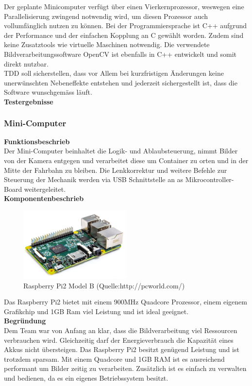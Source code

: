 Der geplante Minicomputer verfügt über einen Vierkernprozessor, weswegen eine Parallelisierung zwingend notwendig wird, um diesen Prozessor auch vollumfänglich nutzen zu können. Bei der Programmiersprache ist C++ aufgrund der Performance und der einfachen Kopplung an C gewählt worden. Zudem sind keine Zusatztools wie virtuelle Maschinen notwendig. Die verwendete Bildverarbeitungssoftware OpenCV ist ebenfalls in C++ entwickelt und somit direkt nutzbar.\\
TDD soll sicherstellen, dass vor Allem bei kurzfristigen Änderungen keine unerwünschten Nebeneffekte entstehen und jederzeit sichergestellt ist, dass die Software wunschgemäss läuft.\\[0.2cm]
\textbf{Testergebnisse}\\[0.2cm]

\subsubsection{Mini-Computer}
\textbf{Funktionsbeschrieb}\\[0.2cm]
Der Mini-Computer beinhaltet die Logik- und Ablaubsteuerung, nimmt Bilder von der Kamera entgegen und verarbeitet diese um Container zu orten und in der Mitte der Fahrbahn zu bleiben. Die Lenkkorrektur und weitere Befehle zur Steuerung der Mechanik werden via USB Schnittstelle an as Mikrocontroller-Board weitergeleitet.\\[0.2cm]
\textbf{Komponentenbeschrieb}\\[0.2cm]
\begin{figure}[H]
	\centering
	\includegraphics[width=0.5\textwidth]{03_Loesungskonzept/pictures/raspberrypi2.png}
	\caption{Raspberry Pi2 Model B (Quelle:http://pcworld.com/)}
\end{figure}
Das Raspberry Pi2 bietet mit einem 900MHz Quadcore Prozessor, einem eigenem Grafikchip und 1GB Ram viel Leistung und ist ideal geeignet.\\[0.2cm]
\textbf{Begründung}\\[0.2cm]
Dem Team war von Anfang an klar, dass die Bildverarbeitung viel Ressourcen verbrauchen wird. Gleichzeitig darf der Energieverbrauch die Kapazität eines Akkus nicht übersteigen. Das Raspberry Pi2 besitzt genügend Leistung und ist trotzdem sparsam. Mit einem Quadcore und 1GB RAM ist es ausreichend performant um Bilder zeitig zu verarbeiten. Zusätzlich ist es einfach zu verwalten und bedienen, da es ein eigenes Betriebssystem besitzt.\\[0.2cm]

